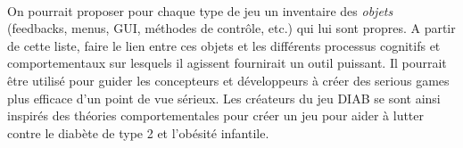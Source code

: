 \paragraph{} On pourrait proposer pour chaque type de jeu un inventaire des \emph{objets} (feedbacks, menus, GUI, méthodes de contrôle, etc.) qui lui sont propres. A partir de cette liste, faire le lien entre ces objets et les différents processus cognitifs et comportementaux sur lesquels il agissent fournirait un outil puissant. Il pourrait être utilisé pour guider les concepteurs et développeurs à créer des serious games plus efficace d'un point de vue sérieux. Les créateurs du jeu DIAB\cite{Wils09} se sont ainsi inspirés des théories comportementales pour créer un jeu pour aider à lutter contre le diabète de type 2 et l'obésité infantile.